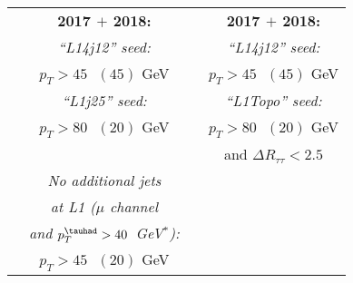 \begin{table}[!h]
\begin{tabular}{ c |c| c |c }
                                 & \small\textbf{2017 $+$ 2018:}   &                                 & \small \textbf{2017 $+$ 2018:}  \\
                                 & \small\textit{``L14j12'' seed:} &                                 & \small\textit{``L14j12'' seed:} \\
                                 & \small $p_T>45\text{ }(45)$ GeV &                                 & \small $p_T>45\text{ }(45)$ GeV \\[0.5em]
                                 & \small\textit{``L1j25'' seed:}  &                                 & \small\textit{``L1Topo'' seed:} \\
                                 & \small $p_T>80\text{ }(20)$ GeV &                                 & \small $p_T>80\text{ }(20)$ GeV \\
                                 &                                 &                                 & \small and $\Delta R_{\tau\tau}<2.5$\\[0.5em]
                                 & \small\textit{No additional jets} &                               &        \\
                                 & \small\textit{at L1 ($\mu$ channel} &                             &        \\
                                 & \small\textit{and $p_T^{\tauhad} >40$~GeV$^*$):} &                &        \\
                                 & \small $p_T>45\text{ }(20)$ GeV &                                 & \small                       \\\cmidrule[0.2pt]{1-4}


\end{tabular}
\end{table}
